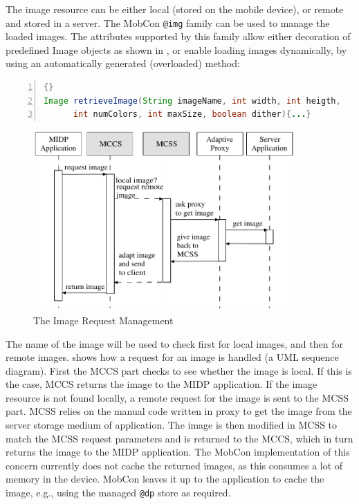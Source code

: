 The image resource can be either local (stored on the mobile device), or remote and stored in a server. The MobCon \texttt{@img} family can be used to manage the loaded images. The attributes supported by this family allow either decoration of predefined Image objects as shown in , or enable loading images dynamically, by using an automatically generated (overloaded) method:

	\begin{center}
		\begin{minipage}[t]{8cm}
		\begin{scriptsize}
\begin{lstlisting}[numbers=left,language=Java,frame=leftline]{}
Image retrieveImage(String imageName, int width, int heigth,
      int numColors, int maxSize, boolean dither){...}
\end{lstlisting}
		\end{scriptsize}
			\end{minipage}
	\end{center}

\begin{figure}[ht]
	\begin{center}
		\includegraphics[width=10cm,height=!]{ch05/mc-img}
	\end{center}
	\caption{The Image Request Management}
	\label{fig:mc-img}
\end{figure}

The name of the image will be used to check first for local images, and then for remote images.  shows how a request for an image is handled (a UML sequence diagram). First the MCCS part checks to see whether the image is local. If this is the case, MCCS returns the image to the MIDP application. If the image resource is not found locally, a remote request for the image is sent to the MCSS part. MCSS relies on the manual code written in proxy to get the image from the server storage medium of application. The image is then modified in MCSS to match the MCSS request parameters and is returned to the MCCS, which in turn returns the image to the MIDP application. The MobCon implementation of this concern currently does not cache the returned images, as this consumes a lot of memory in the device. MobCon leaves it up to the application to cache the image, e.g., using the managed \texttt{@dp} store as required.

